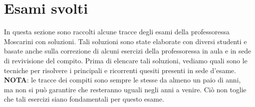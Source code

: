 \section{Esami svolti}
In questa sezione sono raccolti alcune tracce degli esami della professoressa
Moscarini con soluzioni. Tali soluzioni sono state elaborate con diversi studenti
e basate anche sulla correzione di alcuni esercizi della professoressa in aula e 
in sede di revivisione del compito. Prima di elencare tali soluzioni, vediamo quali
sono le tecniche per risolvere i principali e ricorrenti quesiti presenti in sede d'esame.\\
\textbf{NOTA}: le tracce dei compiti sono sempre le stesse da almeno un paio di anni, ma non
si può garantire che resteranno uguali negli anni a venire. Ciò non toglie che tali esercizi 
siano fondamentali per questo esame.
